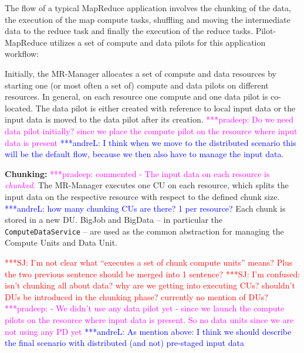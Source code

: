 \documentclass{acm_proc_article-sp}
\newcommand{\jhanote}[1]{ {\textcolor{red} { ***SJ: #1 }}}
\newcommand{\alnote}[1]{ {\textcolor{blue} { ***andreL: #1 }}}
\newcommand{\pnote}[1]{ {\textcolor{magenta} { ***pradeep: #1 }}}
\newcommand{\alnote}[1]{}
\newcommand{\pnote}[1]{}
\newcommand{\jhanote}[1]{}
\newcommand{\pilotmapreduce}{Pilot-MapReduce\xspace}
\newcommand{\mrmg}{MR-Manager\xspace}
\newcommand{\computeunits}{Compute Units\xspace}
\newcommand{\cu}{CU\xspace}
\newcommand{\dataunits}{Data Unit\xspace}
\begin{document}
The flow of a typical MapReduce application involves the chunking of
the data, the execution of the map compute tasks, shuffling and moving
the intermediate data to the reduce task and finally the execution of
the reduce tasks.  \pilotmapreduce utilizes a set of compute and data
pilots for this application workflow: %
\begin{compactenum}[A.]
\item Initially, the \mrmg allocates a set of compute and data
  resources by starting one (or most often a set of) compute and data
  pilots on different resources.  In general, on each resource one
  compute and one data pilot is co-located. The data pilot is either
  created with reference to local input data or the input data is
  moved to the data pilot after its creation.
\pnote{Do we need data pilot initially? since we place the compute pilot on the
resource where input data is present} \alnote{I think when we move to the
distributed scenario this will be the default flow, because we then also have to
manage the input data.}

\item \textbf{Chunking:} \pnote{commented - The input data on each resource is
{\it chunked}.} The \mrmg executes one \cu on each resource, which splits the
input data on the respective resource with respect to the defined chunk
size.\label{stp:chunking} \alnote{how many chunking CUs are there? 1 per
resource?} Each chunk is stored in a new DU. BigJob and BigData -- in particular
the \texttt{ComputeDataService} -- are used as the common abstraction for
managing the \computeunits and \dataunits.
  
  \jhanote{I'm not clear what ``executes a set of chunk compute
    units'' means? Plus the two previous sentence should be merged
    into 1 sentence?} \jhanote{I'm confused: isn't chunking all about
    data? why are we getting into executing CUs? shouldn't DUs be
    introduced in the chunking phase? currently no mention of DUs?}
\pnote{ - We didn't use any data pilot yet - since we launch the compute pilots 
on the resource where input data is present. So no data units since we are not 
using any PD yet} \alnote{As mention above: I think we should describe the final 
scenario with distributed (and not) pre-staged input data}


\end{compactenum}
\end{document}
